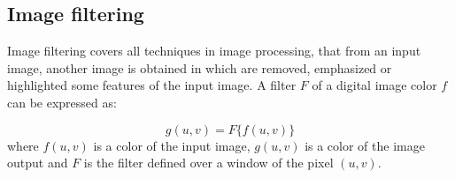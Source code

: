 

	




\subsection{Image filtering}
Image filtering covers all techniques in image processing, that from an input image, another image is obtained in which are removed, emphasized or highlighted some features of the input image. 
A filter $F$ of a digital image color $f$ can be expressed as:

\begin{equation}
\label{Filtrado} 
      g(u,v) = F\{f(u,v)\}
\end{equation}
where $f(u,v)$ is a color of the input image, $g(u,v)$ is a color of the image output and $F$ is the filter defined over a window of the pixel $(u,v)$.


